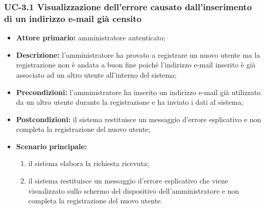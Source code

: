 \subsubsection{UC-3.1 Visualizzazione dell'errore causato dall'inserimento di un indirizzo e-mail già censito}
\begin{itemize}
	\item \textbf{Attore primario:} amministratore autenticato;

	\item \textbf{Descrizione:} l'amministratore ha provato a registrare un nuovo utente ma la registrazione non è andata a buon fine poiché l'indirizzo e-mail inserito è già associato ad un altro utente all'interno del sistema;

	\item \textbf{Precondizioni:} l'amministratore ha inserito un indirizzo e-mail già utilizzato da un altro utente durante la registrazione e ha inviato i dati al sistema;

	\item \textbf{Postcondizioni:} il sistema restituisce un messaggio d'errore esplicativo e non completa la registrazione del nuovo utente;

	\item \textbf{Scenario principale:}
	      \begin{enumerate}
		      \item il sistema elabora la richiesta ricevuta;
		      \item il sistema restituisce un messaggio d'errore esplicativo che viene visualizzato sullo schermo del dispositivo dell'amministratore e non completa la registrazione del nuovo utente.
	      \end{enumerate}
\end{itemize}
